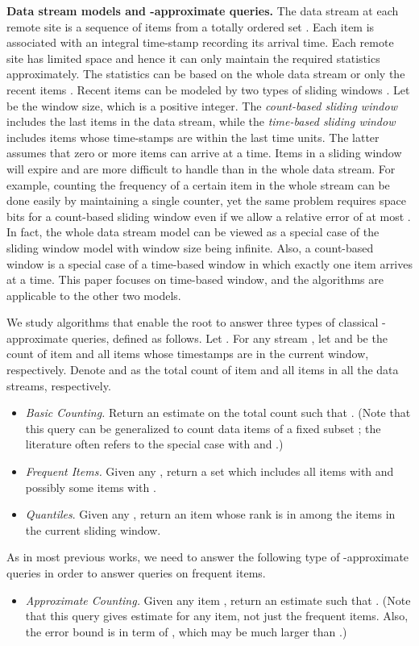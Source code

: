 \documentclass[proceedings]{stacs}
\theoremstyle{definition}\newtheorem{fact}{Fact}
\begin{document}
\vspace{0.5ex}
{\bf Data stream models and {\boldmath }-approximate queries.}
The data stream at
each remote site is a sequence of items from a totally ordered set .
Each item is associated with
an integral time-stamp recording its  {arrival} time.
Each remote site has limited space and hence it
can only maintain the required statistics approximately.
The statistics can be
based on the whole data stream
\cite{AlonMS02,Indyk00,GuhaKS01,DemaineLM02} or
only the recent items
\cite{DatarM02,ArasuM04,LeeT06b}.
Recent items can be modeled by two types of sliding windows
\cite{BabcockDM02,DatarGIM02}.
Let  be the window size, which is a positive integer.
The \emph{count-based sliding window}
includes the last  items in the data stream, while the
\emph{time-based sliding window}
includes items whose time-stamps are within the last  time units.
The latter assumes that zero or more items can arrive at a time.
Items in a sliding window will expire and are more
difficult to handle than in the whole data stream.
For example, counting the frequency of a
certain item in the whole stream
can be done easily by maintaining a single counter, yet the same
problem requires space
 bits
for a count-based sliding window
even if we allow a relative error of at most 
\cite{DatarGIM02, GibbonsT02}.  In fact, the whole data stream model
can be viewed as a special case of the sliding window model with
window size being infinite.  Also,
a count-based window is a special case of a time-based
  window in which exactly one item arrives at a time.
This paper focuses on time-based window, and
the algorithms are applicable to the other two models.

We study algorithms that enable the root to answer
three types of classical
-approximate queries, defined as follows.
Let . For any stream ,
let 
and  be the count of
item  and all items
  {whose timestamps are} in the current window,
respectively.
Denote  and 
as the total count of item  and all items in all the data streams,
respectively.

\begin{itemize}
\item{\it Basic Counting.}
Return an estimate  on the total count 
such that .  (Note that this query can be generalized to count
data items of a fixed subset ;
the literature often refers to the special case with
 and .)
\item{\it Frequent Items.}
Given any ,
return
a set  which includes all items  with 
and possibly some items  with .


\item{\it Quantiles}.
Given any , return an
item whose rank is in 
among the  items in the current sliding window.
\end{itemize}
  {As in most previous works,
we need to answer the
  following type of -approximate
queries in order to answer queries on frequent items.}
\begin{itemize}
\item{\it Approximate Counting.}
Given any item ,
return an estimate  such that .
(Note that this query gives estimate for any item, not just the
frequent items.   {Also, the error bound is in term
of , which may be much larger than .})
\end{itemize}
\end{document}
